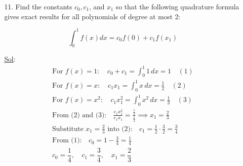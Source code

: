 \begin{enumerate}
  \item[11.] Find the constants \(c_0, c_1\), and \(x_1\) so that the following quadrature formula gives exact results for all polynomials of degree at most 2:
  
      \[
          \int_{0}^{1} f(x) dx = c_0 f(0) + c_1 f(x_1)
      \]


      \underline{Sol}:\\

      \[
          \begin{array}{l}
             \text{For } f(x) = 1: \quad c_0 + c_1 = \int_{0}^{1} 1 \, dx = 1 \quad (1) \\
             \text{For } f(x) = x: \quad c_1 x_1 = \int_{0}^{1} x \, dx = \frac{1}{2} \quad (2) \\
             \text{For } f(x) = x^2: \quad c_1 x_1^2 = \int_{0}^{1} x^2 \, dx = \frac{1}{3} \quad (3) \\
             \text{From (2) and (3):} \quad \frac{c_1 x_1^2}{c_1 x_1} = \frac{\frac{1}{3}}{\frac{1}{2}} \implies x_1 = \frac{2}{3} \\
             \text{Substitute } x_1 = \frac{2}{3} \text{ into (2):} \quad c_1 = \frac{1}{2} \cdot \frac{3}{2} = \frac{3}{4} \\
             \text{From (1):} \quad c_0 = 1 - \frac{3}{4} = \frac{1}{4} \\
             \boxed{c_0 = \dfrac{1}{4}, \quad c_1 = \dfrac{3}{4}, \quad x_1 = \dfrac{2}{3}}
          \end{array}
      \]
\end{enumerate}